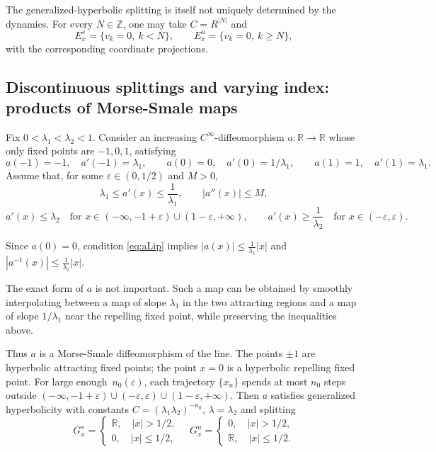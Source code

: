 \documentclass[12pt]{article}
\newcommand{\Zz}{\mathbb{Z}}
\newcommand{\Rr}{\mathbb{R}}
\theoremstyle{definition}
\begin{document}
The generalized-hyperbolic splitting is itself not uniquely determined
by the dynamics. For every $N\in\Zz$, one may take
$C=R^{|N|}$ and
\[
E_x^s=\{v_k=0,\ k<N\},
\qquad
E_x^u=\{v_k=0,\ k\geq N\},
\]
with the corresponding coordinate projections.

\subsection{Discontinuous splittings and varying index:
products of Morse-Smale maps}

Fix $0<\lambda_1<\lambda_2<1$.
Consider an increasing $C^\infty$-diffeomorphism
$a:\Rr\to\Rr$ whose only fixed points are $-1,0,1$, satisfying
\[
a(-1)=-1,\quad a'(-1)=\lambda_1,\qquad
a(0)=0,\quad a'(0)=1/\lambda_1,\qquad
a(1)=1,\quad a'(1)=\lambda_1.
\]
Assume that, for some $\varepsilon\in(0,1/2)$ and $M>0$,
\begin{equation}\label{eq:aLip}
\lambda_1\leq a'(x)\leq\frac1{\lambda_1},
\qquad |a''(x)|\leq M,
\end{equation}
\[
a'(x)\leq\lambda_2
\quad\text{for }x\in(-\infty,-1+\varepsilon)\cup(1-\varepsilon,+\infty),
\qquad
a'(x)\geq\frac1{\lambda_2}
\quad\text{for }x\in(-\varepsilon,\varepsilon).
\]

Since $a(0)=0$, condition \eqref{eq:aLip} implies
$
|a(x)|\leq\frac1{\lambda_1}|x|$ and
$|a^{-1}(x)|\leq\frac1{\lambda_1}|x|.
$

The exact form of $a$ is not important. Such a map can be obtained by smoothly interpolating between a map of slope $\lambda_1$ in the two attracting regions and a map of slope $1/\lambda_1$ near the repelling fixed point, while preserving the inequalities above.

Thus $a$ is a Morse-Smale diffeomorphism of the line. The points $\pm 1$ are hyperbolic attracting fixed points; the point $x = 0$ is a hyperbolic repelling fixed point. For large enough~$n_0(\varepsilon)$, each trajectory $\{x_n\}$ spends at most $n_0$ steps outside $(-\infty, -1+\varepsilon) \cup (-\varepsilon, \varepsilon) \cup (1-\varepsilon, +\infty)$. Then $a$ satisfies generalized hyperbolicity with constants $C = (\lambda_1\lambda_2)^{-n_0}$, $\lambda = \lambda_2$ and splitting
$$
G^s_x = 
\begin{cases}
    \Rr, \quad |x| > 1/2,\\
    0, \quad |x| \leq 1/2,
\end{cases}
\quad
G^u_x = 
\begin{cases}
    0, \quad |x| > 1/2,\\
    \Rr, \quad |x| \leq 1/2.
\end{cases}
$$
\end{document}
